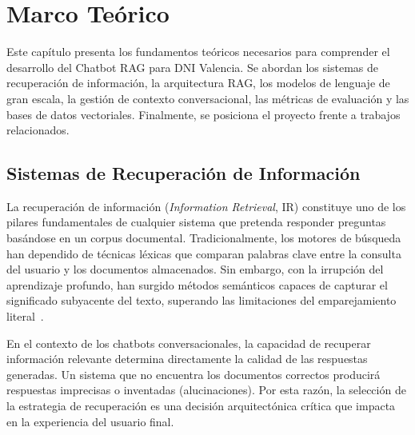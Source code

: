 
\section{Marco Te\'orico}
\label{sec:marco-teorico}

Este cap\'itulo presenta los fundamentos te\'oricos necesarios para comprender el desarrollo del Chatbot RAG para DNI Valencia. Se abordan los sistemas de recuperaci\'on de informaci\'on, la arquitectura RAG, los modelos de lenguaje de gran escala, la gesti\'on de contexto conversacional, las m\'etricas de evaluaci\'on y las bases de datos vectoriales. Finalmente, se posiciona el proyecto frente a trabajos relacionados.

\subsection{Sistemas de Recuperaci\'on de Informaci\'on}
\label{subsec:sistemas-recuperacion}

La recuperaci\'on de informaci\'on (\textit{Information Retrieval}, IR) constituye uno de los pilares fundamentales de cualquier sistema que pretenda responder preguntas bas\'andose en un corpus documental. Tradicionalmente, los motores de b\'usqueda han dependido de t\'ecnicas l\'exicas que comparan palabras clave entre la consulta del usuario y los documentos almacenados. Sin embargo, con la irrupci\'on del aprendizaje profundo, han surgido m\'etodos sem\'anticos capaces de capturar el significado subyacente del texto, superando las limitaciones del emparejamiento literal~\cite{lewis2020rag}.

En el contexto de los chatbots conversacionales, la capacidad de recuperar informaci\'on relevante determina directamente la calidad de las respuestas generadas. Un sistema que no encuentra los documentos correctos producir\'a respuestas imprecisas o inventadas (alucinaciones). Por esta raz\'on, la selecci\'on de la estrategia de recuperaci\'on es una decisi\'on arquitect\'onica cr\'itica que impacta en la experiencia del usuario final.

